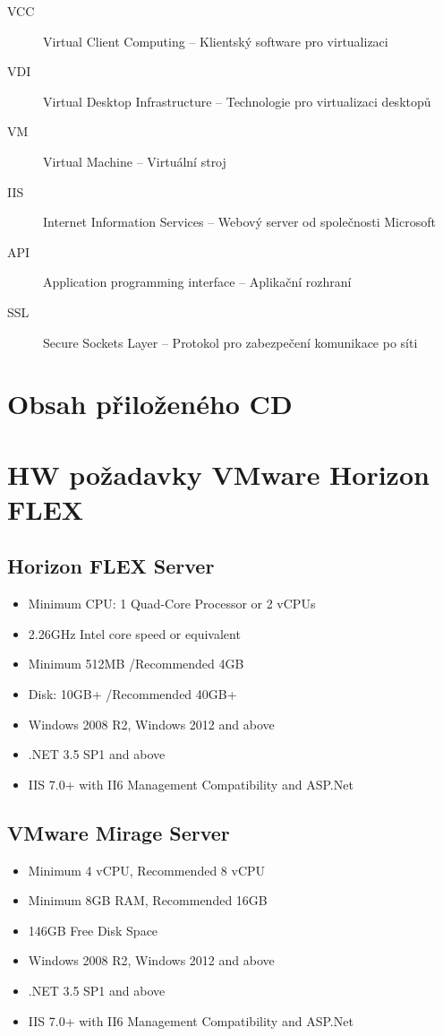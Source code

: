 \begin{description}
	\item[VCC] Virtual Client Computing -- Klientský software pro virtualizaci
	\item[VDI] Virtual Desktop Infrastructure -- Technologie pro virtualizaci desktopů
	\item[VM] Virtual Machine -- Virtuální stroj
	\item[IIS] Internet Information Services -- Webový server od společnosti Microsoft
	\item[API] Application programming interface -- Aplikační rozhraní
	\item[SSL] Secure Sockets Layer -- Protokol pro zabezpečení komunikace po síti
\end{description}

%


\chapter{Obsah přiloženého CD}
 
 
\chapter{HW požadavky VMware Horizon FLEX}\label{pozadavky}

\section{Horizon FLEX Server}
\begin{itemize}
\item Minimum CPU: 1 Quad-Core Processor or 2 vCPUs
\item 2.26GHz Intel core speed or equivalent
\item Minimum 512MB /Recommended 4GB
\item Disk: 10GB+ /Recommended 40GB+
\item Windows 2008 R2, Windows 2012 and above
\item .NET 3.5 SP1 and above
\item IIS 7.0+ with II6 Management Compatibility and ASP.Net
\end{itemize}

\section{VMware Mirage Server}
\begin{itemize}
\item  Minimum 4 vCPU, Recommended 8 vCPU
\item Minimum 8GB RAM, Recommended 16GB
\item  146GB Free Disk Space
\item Windows 2008 R2, Windows 2012 and above
\item .NET 3.5 SP1 and above
\item IIS 7.0+ with II6 Management Compatibility and ASP.Net 
\end{itemize}